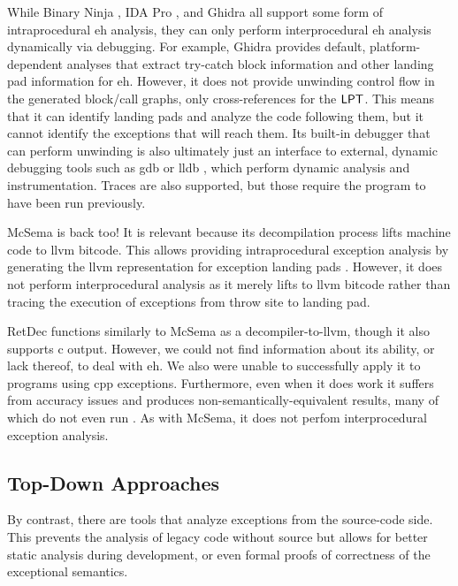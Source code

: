 While Binary Ninja \autocite{binary-ninja}, IDA Pro \autocite{ida}, and Ghidra \autocite{ghidra} all support some form of intraprocedural \ac{eh} analysis, they can only perform interprocedural \ac{eh} analysis dynamically via debugging.
For example, Ghidra provides default, platform-dependent analyses that extract try-catch block information and other landing pad information for \ac{eh}.
However, it does not provide unwinding control flow in the generated block/call graphs, only cross-references for the $\operatorname{\mathsf{LPT}}$.
This means that it can identify landing pads and analyze the code following them, but it cannot identify the exceptions that will reach them.
Its built-in debugger that can perform unwinding is also ultimately just an interface to external, dynamic debugging tools such as \ac{gdb} or \gls{lldb} \autocite{lldb},
which perform dynamic analysis and instrumentation. Traces are also supported,
but those require the program to have been run previously.

McSema \autocite{mcsema} is back too! It is relevant because its decompilation process lifts machine code to \gls{llvm} bitcode.
This allows providing intraprocedural exception analysis by generating the \gls{llvm} representation for exception landing pads \autocite{mcsema-exceptions}.
However, it does not perform interprocedural analysis as it merely lifts to \gls{llvm} bitcode rather than tracing the execution of exceptions from throw site to landing pad.

RetDec \autocite{retdec} functions similarly to McSema as a decompiler-to-\gls{llvm}, though it also supports \gls{c} output.
However, we could not find information about its ability, or lack thereof, to deal with \ac{eh}. We also were unable to successfully apply it to programs using \gls{cpp} exceptions.
Furthermore, even when it does work it suffers from accuracy issues and produces non-semantically-equivalent results, many of which do not even run \autocite{foudree2019regsym}.
As with McSema, it does not perfom interprocedural exception analysis.

\subsection{Top-Down Approaches}
By contrast, there are tools that analyze exceptions from the source-code side.
This prevents the analysis of legacy code without source but allows for better static analysis during development, or even formal proofs of correctness of the exceptional semantics.

